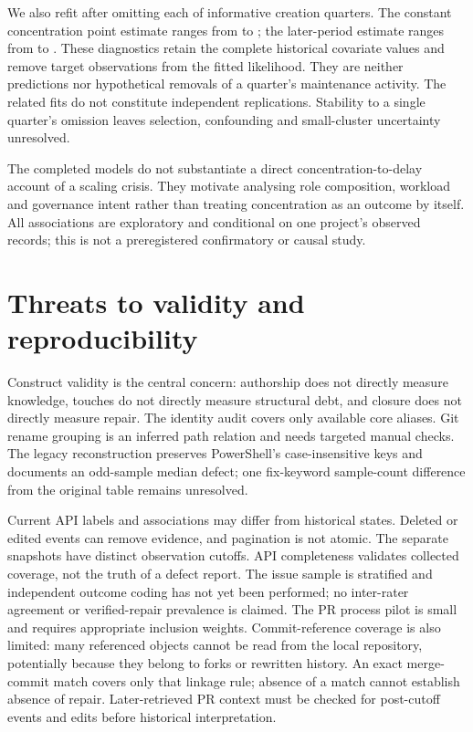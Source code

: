 \documentclass[11pt]{article}
\begin{document}
We also refit after omitting each of \InfluenceQuarterCount{} informative
creation quarters. The constant concentration point estimate ranges from
\InfluenceConstantMin{} to \InfluenceConstantMax{}; the later-period estimate
ranges from \InfluenceLateMin{} to \InfluenceLateMax{}.
These diagnostics retain the complete historical covariate values and remove
target observations from the fitted likelihood. They are neither predictions
nor hypothetical removals of a quarter's maintenance activity. The related fits
do not constitute independent replications. Stability to a single quarter's
omission leaves selection, confounding and small-cluster uncertainty unresolved.

The completed models do not substantiate a direct concentration-to-delay account
of a scaling crisis. They motivate analysing role composition, workload and
governance intent rather than treating concentration as an outcome by itself.
All associations are exploratory and conditional on one project's observed
records; this is not a preregistered confirmatory or causal study.

\section{Threats to validity and reproducibility}
Construct validity is the central concern: authorship does not directly measure
knowledge, touches do not directly measure structural debt, and closure does
not directly measure repair. The identity audit covers only available core
aliases. Git rename grouping is an inferred path relation and needs targeted
manual checks. The legacy reconstruction preserves PowerShell's case-insensitive
keys and documents an odd-sample median defect; one fix-keyword sample-count
difference from the original table remains unresolved.

Current API labels and associations may differ from historical states. Deleted
or edited events can remove evidence, and pagination is not atomic. The separate
snapshots have distinct observation cutoffs. API completeness validates collected
coverage, not the truth of a defect report. The issue sample is stratified and
independent outcome coding has not yet been performed; no inter-rater agreement
or verified-repair prevalence is claimed. The PR process pilot is small and
requires appropriate inclusion weights.
Commit-reference coverage is also limited: many referenced objects cannot be
read from the local repository, potentially because they belong to forks or
rewritten history. An exact merge-commit match covers only that linkage rule;
absence of a match cannot establish absence of repair. Later-retrieved PR context
must be checked for post-cutoff events and edits before historical interpretation.
\end{document}
